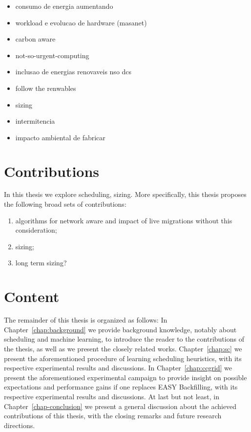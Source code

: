 \begin{itemize}

    \item consumo de energia aumentando    
    \item workload e evolucao de hardware (masanet)
    \item carbon aware
    \item not-so-urgent-computing
    \item inclusao de energias renovaveis nso dcs
   \item follow the renwables
   \item sizing
   \item intermitencia
   \item impacto ambiental de fabricar


\end{itemize}
\section{Contributions}

In this thesis we explore scheduling, sizing. More specifically, this thesis proposes the following broad sets of contributions:

\begin{enumerate}
    \item algorithms for network aware and impact of live migrations without this consideration;
    
    
    \item sizing;
    
    \item long term sizing?
    
\end{enumerate}

\section{Content}

The remainder of this thesis is organized as follows: In Chapter~\ref{chap:background} we provide background knowledge, notably about scheduling and machine learning, to introduce the reader to the contributions of the thesis, as well as we present the closely related works. Chapter~\ref{chap:sc} we present the aforementioned procedure of learning scheduling heuristics, with its respective experimental results and discussions. In Chapter~\ref{chap:ccgrid} we present the aforementioned experimental campaign to provide insight on possible expectations and performance gains if one replaces EASY Backfilling, with its respective experimental results and discussions. At last but not least, in Chapter~\ref{chap-conclusion} we present a general discussion about the achieved contributions of this thesis, with the closing remarks and future research directions.

